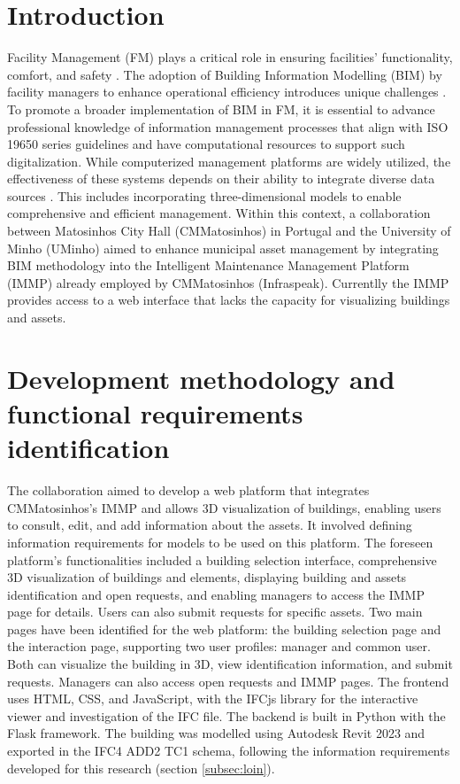 \documentclass[a4paper, 10pt, twocolumn, twoside]{article}
\begin{document}

\section{Introduction}
\label{sec:Introduction}

Facility Management (FM) plays a critical role in ensuring facilities' functionality, comfort, and safety \cite{IFMA2023}. The adoption of Building Information Modelling (BIM) by facility managers to enhance operational efficiency introduces unique challenges \cite{Pinti2022}. To promote a broader implementation of BIM in FM, it is essential to advance professional knowledge of information management processes that align with ISO 19650 series guidelines and have computational resources to support such digitalization. While computerized management platforms are widely utilized, the effectiveness of these systems depends on their ability to integrate diverse data sources \cite{Durdyev2022, Siccardi2023}. This includes incorporating three-dimensional models to enable comprehensive and efficient management. Within this context, a collaboration between Matosinhos City Hall (CMMatosinhos) in Portugal and the University of Minho (UMinho) aimed to enhance municipal asset management by integrating BIM methodology into the Intelligent Maintenance Management Platform (IMMP) already employed by CMMatosinhos (Infraspeak). Currentlly the IMMP provides access to a web interface that lacks the capacity for visualizing buildings and assets.

\section{Development methodology and functional requirements identification}
\label{sec:methodology}

The collaboration aimed to develop a web platform that integrates CMMatosinhos's IMMP and allows 3D visualization of buildings, enabling users to consult, edit, and add information about the assets. It involved defining information requirements for models to be used on this platform. The foreseen platform's functionalities included a building selection interface, comprehensive 3D visualization of buildings and elements, displaying building and assets identification and open requests, and enabling managers to access the IMMP page for details. Users can also submit requests for specific assets. Two main pages have been identified for the web platform: the building selection page and the interaction page, supporting two user profiles: manager and common user. Both can visualize the building in 3D, view identification information, and submit requests. Managers can also access open requests and IMMP pages. The frontend uses HTML, CSS, and JavaScript, with the IFCjs library for the interactive viewer and investigation of the IFC file. The backend is built in Python with the Flask framework. The building was modelled using Autodesk Revit 2023 and exported in the IFC4 ADD2 TC1 schema, following the information requirements developed for this research (section \ref{subsec:loin}).
\end{document}

